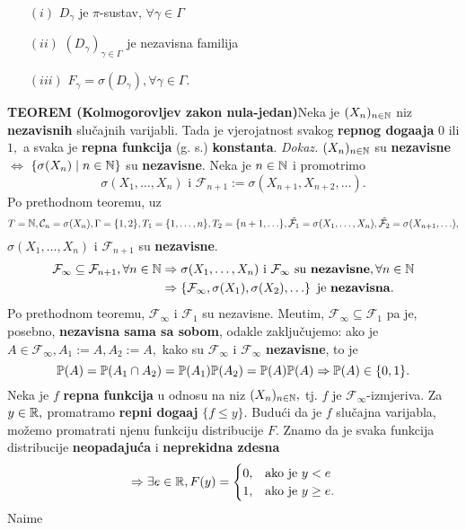 \documentclass{article}
\begin{document}
\begin{enumerate}
    \item[\((i)\)] \(D_\gamma\) je \(\pi\)-sustav, \(\forall\gamma\in\Gamma\)
    \item[\((ii)\)] \((D_\gamma)_{\gamma\in\Gamma}\) je nezavisna familija
    \item[\((iii)\)] \(F_\gamma=\sigma\left(D_\gamma\right),\forall\gamma\in\Gamma.\)
\end{enumerate}
\textbf{TEOREM (Kolmogorovljev zakon nula-jedan)}\newline Neka je \((X_n)_{n\in\Bbb N}\) niz \textbf{nezavisnih} slučajnih varijabli. Tada je vjerojatnost svakog \textbf{repnog doga\dj{}aja} \(0\) ili \(1,\) a svaka je \textbf{repna funkcija} (g. s.) \textbf{konstanta}.\newline\newline
\textit{Dokaz.}\newline
\((X_n)_{n\in\Bbb N}\) su \textbf{nezavisne} \(\Leftrightarrow\) \(\left\{\sigma(X_n)\mid n\in\Bbb N\right\}\) su \textbf{nezavisne}. Neka je \(n\in\Bbb N\) i promotrimo \[\sigma(X_1,\ldots,X_n)\text{ i }\mathcal F_{n+1}:=\sigma\left(X_{n+1},X_{n+2},\ldots\right).\] Po prethodnom teoremu, uz \[T=\Bbb N,\mathcal C_n=\sigma(X_n),\Gamma=\{1,2\},T_1=\{1,\ldots,n\},T_2=\{n+1,\ldots\},\tilde{\mathcal F_1}=\sigma(X_1,\ldots, X_n),\tilde{\mathcal F_2}=\sigma(X_{n+1},\ldots),\] \(\sigma(X_1,\ldots,X_n)\) i \(\mathcal F_{n+1}\) su \textbf{nezavisne}. \[\begin{aligned}\mathcal F_\infty\subseteq\mathcal F_{n+1},\forall n\in\Bbb N&\Rightarrow \sigma(X_1,\ldots,X_n)\text{ i }\mathcal F_\infty\text{ su }\mathbf{nezavisne},\forall n\in\Bbb N\\&\Rightarrow\left\{\mathcal F_\infty,\sigma(X_1),\sigma(X_2),\ldots\right\}\text{ je }\mathbf{nezavisna}.\end{aligned}\] Po prethodnom teoremu, \(\mathcal F_\infty\) i \(\mathcal F_1\) su nezavisne. Me\dj{}utim, \(\mathcal F_\infty\subseteq\mathcal F_1\) pa je, posebno, \textbf{nezavisna sama sa sobom}, odakle zaključujemo: ako je \(A\in\mathcal F_\infty, A_1:=A, A_2:=A,\) kako su \(\mathcal F_\infty\) i \(\mathcal F_\infty\) \textbf{nezavisne}, to je \[\Bbb P(A)=\Bbb P(A_1\cap A_2)=\Bbb P(A_1)\Bbb P(A_2)=\Bbb P(A)\Bbb P(A)\Rightarrow\Bbb P(A)\in\{0,1\}.\] Neka je \(f\) \textbf{repna funkcija} u odnosu na niz \((X_n)_{n\in\Bbb N},\) tj. \(f\) je \(\mathcal F_\infty\)-izmjeriva. Za \(y\in\Bbb R,\) promatramo \textbf{repni doga\dj{}aj} \(\{f\le y\}.\)  Budući da je \(f\) slučajna varijabla, možemo promatrati njenu funkciju distribucije \(F.\) Znamo da je svaka funkcija distribucije \textbf{neopadajuća} i \textbf{neprekidna zdesna} \[\Rightarrow\exists e\in\Bbb R, F(y)=\begin{cases}0,&\text{ako je }y<e\\1,&\text{ako je }y\ge e.\end{cases}\] Naime 
\end{document}
